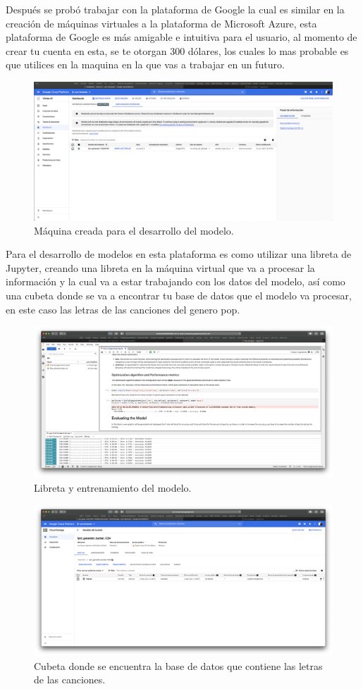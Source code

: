 \documentclass[12pt, a4paper, titlepage]{report}
\begin{document}
Después se probó trabajar con la plataforma de Google la cual es similar en la creación de máquinas  virtuales a la plataforma de Microsoft Azure, esta plataforma de Google es más amigable e intuitiva para el usuario, al momento de crear tu cuenta en esta, se te otorgan 300 dólares, los cuales lo mas probable es que utilices en la maquina en la que vas a trabajar en un futuro.
\begin{figure}[H] 
	\includegraphics[width=12cm]{./imagenes/Desarrollo/Maquina.png}
	\centering 
	\caption{Máquina creada para el desarrollo del modelo.}
\end{figure}
Para el desarrollo de modelos en esta plataforma es como utilizar una libreta de Jupyter, creando una libreta en la máquina virtual que va a procesar la información y la cual va a estar trabajando con los datos del modelo, así como una cubeta donde se va a encontrar tu base de datos que el modelo va procesar, en este caso las letras de las canciones del genero pop.
\begin{figure}[H] 
	\includegraphics[width=12cm]{./imagenes/Desarrollo/Notebook.png}
	\centering 
	\caption{Libreta y entrenamiento del modelo.}
\end{figure}
\begin{figure}[H] 
\includegraphics[width=12cm]{./imagenes/Desarrollo/Bucket.png}
\centering 
\caption{Cubeta donde se encuentra la base de datos que contiene las letras de las canciones.}
\end{figure}
\end{document}
